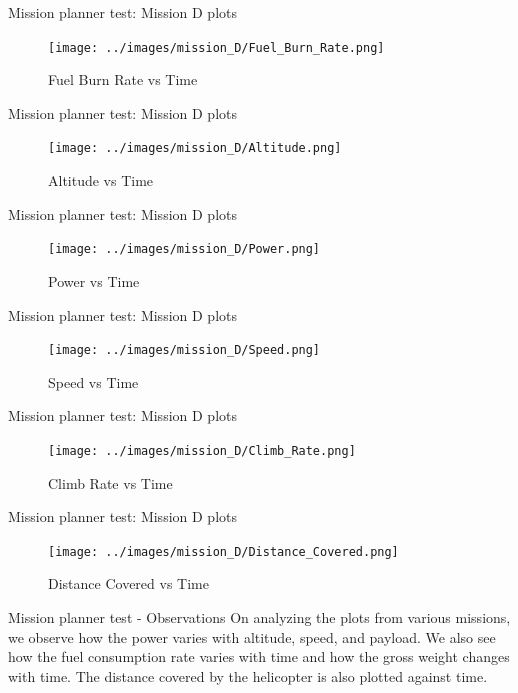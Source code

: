 \documentclass{beamer}
\begin{document}
\begin{frame}{Mission planner test: Mission D plots}
  \begin{figure}
    \centering
    \texttt{[image: ../images/mission\_D/Fuel\_Burn\_Rate.png]}
    \caption{Fuel Burn Rate vs Time}
  \end{figure}
\end{frame}

\begin{frame}{Mission planner test: Mission D plots}
  \begin{figure}
    \centering
    \texttt{[image: ../images/mission\_D/Altitude.png]}
    \caption{Altitude vs Time}
  \end{figure}

\end{frame}

\begin{frame}{Mission planner test: Mission D plots}
  \begin{figure}
    \centering
    \texttt{[image: ../images/mission\_D/Power.png]}
    \caption{Power vs Time}
  \end{figure}
\end{frame}

\begin{frame}{Mission planner test: Mission D plots}
  \begin{figure}
    \centering
    \texttt{[image: ../images/mission\_D/Speed.png]}
    \caption{Speed vs Time}
  \end{figure}
\end{frame}

\begin{frame}{Mission planner test: Mission D plots}
  \begin{figure}
    \centering
    \texttt{[image: ../images/mission\_D/Climb\_Rate.png]}
    \caption{Climb Rate vs Time}
  \end{figure}
\end{frame}

\begin{frame}{Mission planner test: Mission D plots}
  \begin{figure}
    \centering
    \texttt{[image: ../images/mission\_D/Distance\_Covered.png]}
    \caption{Distance Covered vs Time}
  \end{figure}
\end{frame}

\begin{frame}{Mission planner test - Observations}
  On analyzing the plots from various missions, we observe how the power varies with altitude, speed, and payload. We also see how the fuel consumption rate varies with time and how the gross weight changes with time. The distance covered by the helicopter is also plotted against time.
\end{frame}
\end{document}
